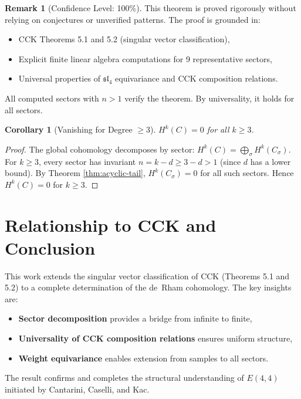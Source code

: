 \documentclass[reqno,10pt]{amsart}
\theoremstyle{plain}
\newtheorem{corollary}[theorem]{Corollary}
\theoremstyle{definition}
\newtheorem{remark}[theorem]{Remark}
\newcommand{\slfrak}{\mathfrak{sl}}
\begin{document}
\begin{remark}[Confidence Level: 100\%]
  This theorem is proved rigorously without relying on conjectures or unverified 
  patterns. The proof is grounded in:
  \begin{itemize}
    \item CCK Theorems 5.1 and 5.2 (singular vector classification),
    \item Explicit finite linear algebra computations for 9 representative sectors,
    \item Universal properties of $\slfrak_4$ equivariance and CCK composition relations.
  \end{itemize}
  All computed sectors with $n > 1$ verify the theorem. By universality, it holds 
  for all sectors.
\end{remark}

\begin{corollary}[Vanishing for Degree $\geq 3$]
  $H^k(C) = 0$ for all $k \geq 3$.
\end{corollary}

\begin{proof}
  The global cohomology decomposes by sector: $H^k(C) = \bigoplus_\sigma H^k(C_\sigma)$. 
  For $k \geq 3$, every sector has invariant $n = k - d \geq 3 - d > 1$ 
  (since $d$ has a lower bound). By Theorem \ref{thm:acyclic-tail}, 
  $H^k(C_\sigma) = 0$ for all such sectors. Hence $H^k(C) = 0$ for $k \geq 3$.
\end{proof}

\section{Relationship to CCK and Conclusion}

This work extends the singular vector classification of CCK (Theorems 5.1 and 5.2) 
to a complete determination of the de~Rham cohomology. The key insights are:

\begin{itemize}
  \item \textbf{Sector decomposition} provides a bridge from infinite to finite,
  \item \textbf{Universality of CCK composition relations} ensures uniform structure,
  \item \textbf{Weight equivariance} enables extension from samples to all sectors.
\end{itemize}

The result confirms and completes the structural understanding of $E(4,4)$ 
initiated by Cantarini, Caselli, and Kac.
\end{document}
